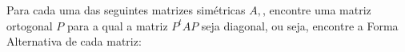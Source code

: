 \documentclass[11pt,a4paper]{article}
\begin{document}
\begin{exercicio}
 
Para cada uma das seguintes matrizes simétricas $A,$, encontre uma matriz ortogonal $P$ para a qual a matriz $P^tAP$ seja diagonal, ou seja, encontre a Forma Alternativa de cada matriz:

\end{exercicio}
\end{document}
